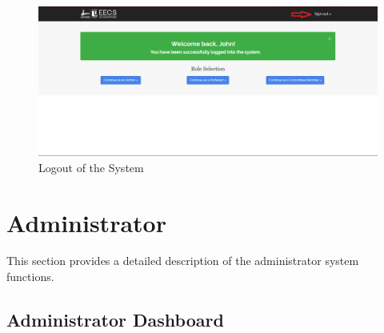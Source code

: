\documentclass[fontsize=12pt,paper=letter,twoside]{scrartcl}
\begin{document}
\begin{figure}[!htb]
\begin{center}
\includegraphics[width=.99\textwidth]{images/logout.png}
\end{center}
\caption{Logout of the System}
\label{fig:logout}
\end{figure}

\clearpage
\newpage
\section{Administrator}
This section provides a detailed description of the administrator system functions.

\subsection{Administrator Dashboard}
\end{document}
